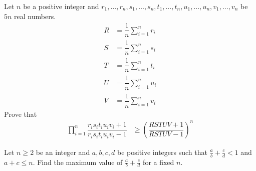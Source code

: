 \documentclass{subfile}
\begin{document}
		\begin{problem}
			Let $n$ be a positive integer and $r_{1},\ldots,r_{n},s_{1},\ldots,s_{n},t_{1},\ldots,t_{n},u_{1},\ldots,u_{n},v_{1},\ldots,v_{n}$ be $5n$ real numbers.
				\begin{align*}
					R
						& = \dfrac{1}{n}\sum_{i=1}^{n}r_{i}\\
					S
						& = \dfrac{1}{n}\sum_{i=1}^{n}s_{i}\\
					T
						& = \dfrac{1}{n}\sum_{i=1}^{n}t_{i}\\
					U
						& = \dfrac{1}{n}\sum_{i=1}^{n}u_{i}\\
					V
						& = \dfrac{1}{n}\sum_{i=1}^{n}v_{i}
				\end{align*}
			Prove that
				\begin{align*}
					\prod_{i=1}^{n}\dfrac{r_{i}s_{i}t_{i}u_{i}v_{i}+1}{r_{i}s_{i}t_{i}u_{i}v_{i}-1}
						& \geq \left(\dfrac{RSTUV+1}{RSTUV-1}\right)^{n}
				\end{align*}
		\end{problem}
	
		\begin{problem}
			Let $n\geq 2$ be an integer and $a,b,c,d$ be positive integers such that $\frac{a}{b}+\frac{c}{d}<1$ and $a+c\leq n$. Find the maximum value of $\frac{a}{b}+\frac{c}{d}$ for a fixed $n$.
		\end{problem}
\end{document}
